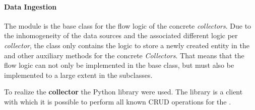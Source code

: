 \paragraph{Data Ingestion}
\label{par:ingestion}


The  module is the base class for the flow logic of the concrete \textit{collectors}.
Due to the inhomogeneity of the data sources and the associated different logic per \textit{collector}, the  class only contains the logic
to store a newly created entity in the \gds{} and other auxiliary methods for the concrete \textit{Collectors}.
That means that the flow logic can not only be implemented in the base class, but must also be implemented to a large extent in the subclasses.

To realize the \textbf{collector} the Python library  were used.
The library  is a client with which it is possible to perform all known \ac{CRUD} operations for the \gds{}.
